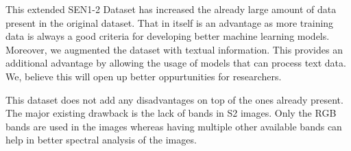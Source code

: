 This extended SEN1-2 Dataset has increased the already large amount of data present in the original dataset. That in itself is an advantage as more training data is always a good criteria for developing better machine learning models. Moreover, we augmented the dataset with textual information. This provides an additional advantage by allowing the usage of models that can process text data. We, believe this will open up better oppurtunities for researchers.

This dataset does not add any disadvantages on top of the ones already present. The major existing drawback is the lack of bands in S2 images. Only the RGB bands are used in the images whereas having multiple other available bands can help in better spectral analysis of the images.